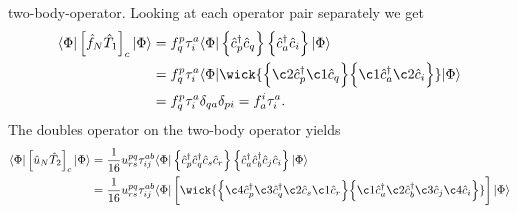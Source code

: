         two-body-operator.
        Looking at each operator pair separately we get
        \begin{align}
            \bra{\slat}\brak{
                \fock_N\clust_1
            }_c\ket{\slat}
            &=
            \fockten^{p}_{q}\clustamp^{a}_{i}
            \bra{\slat}\brac{
                \ccr{p}\can{q}
            }\brac{
                \ccr{a}
                \can{i}
            }\ket{\slat}
            \\
            &=
            \fockten^{p}_{q}\clustamp^{a}_{i}
            \bra{\slat}
            \wick{
                \Big\{
                    \c2 {\ccr{p}}
                    \c1 {\can{q}}
                \Big\}
                \Big\{
                    \c1 {\ccr{a}}
                    \c2 {\can{i}}
                \Big\}
            }
            \ket{\slat}
            \\
            &=
            \fockten^{p}_{q}\clustamp^{a}_{i}
            \delta_{qa}\delta_{pi}
            = \fockten^{i}_{a}\clustamp^{a}_{i}.
        \end{align}
        The doubles operator on the two-body operator yields
        \begin{align}
            \bra{\slat}\brak{
                \twohamil_N \clust_2
            }_c
            \ket{\slat}
            &=
            \frac{1}{16}\twoten^{pq}_{rs}\clustamp^{ab}_{ij}
            \bra{\slat}
            \brac{
                \ccr{p}
                \ccr{q}
                \can{s}
                \can{r}
            }
            \brac{
                \ccr{a}
                \ccr{b}
                \can{j}
                \can{i}
            }
            \ket{\slat}
            \\
            &=
            \frac{1}{16}\twoten^{pq}_{rs}\clustamp^{ab}_{ij}
            \bra{\slat}\brak{
                \wick{
                    \Big\{
                        \c4 {\ccr{p}}
                        \c3 {\ccr{q}}
                        \c2 {\can{s}}
                        \c1 {\can{r}}
                    \Big\}
                    \Big\{
                        \c1 {\ccr{a}}
                        \c2 {\ccr{b}}
                        \c3 {\can{j}}
                        \c4 {\can{i}}
                    \Big\}
                }
            }
            \ket{\slat}
        \end{align}

